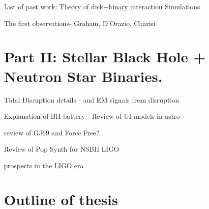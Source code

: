 List of past work:
Theory of disk+binary interaction
Simulations

The first observations- Graham, D'Orazio, Charisi



\section{Part II: Stellar Black Hole + Neutron Star Binaries.}

Tidal Disruption details - and EM signals from disruption

Explanation of BH battery - Review of UI models in astro

review of GJ69 and Force Free?

Review of Pop Synth for NSBH LIGO


prospects in the LIGO era









\section{Outline of thesis}























